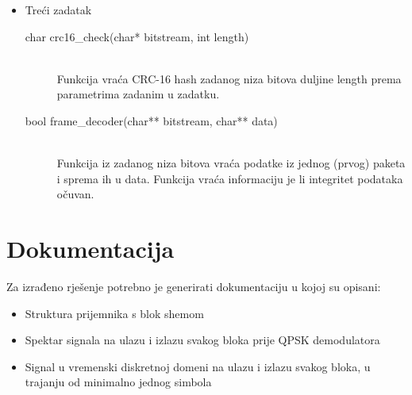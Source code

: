 \documentclass[a4paper]{article}
\begin{document}
\begin{itemize}
\begin{description}
	\end{description}
\item Treći zadatak
	\begin{description}
		\item[char crc16\_check(char* bitstream, int length)]
		\,\\ Funkcija vraća CRC-16 hash zadanog niza bitova duljine length prema parametrima zadanim u zadatku.
		\item[bool frame\_decoder(char** bitstream, char** data)]
		\,\\ Funkcija iz zadanog niza bitova vraća podatke iz jednog (prvog) paketa i sprema ih u data. Funkcija vraća informaciju je li integritet podataka očuvan.
	\end{description}
\end{itemize}

\section{Dokumentacija}

Za izrađeno rješenje potrebno je generirati dokumentaciju u kojoj su opisani:
\begin{itemize}
\item Struktura prijemnika s blok shemom
\item Spektar signala na ulazu i izlazu svakog bloka prije QPSK demodulatora
\item Signal u vremenski diskretnoj domeni na ulazu i izlazu svakog bloka, u trajanju od minimalno jednog simbola
\end{itemize}
\end{document}
